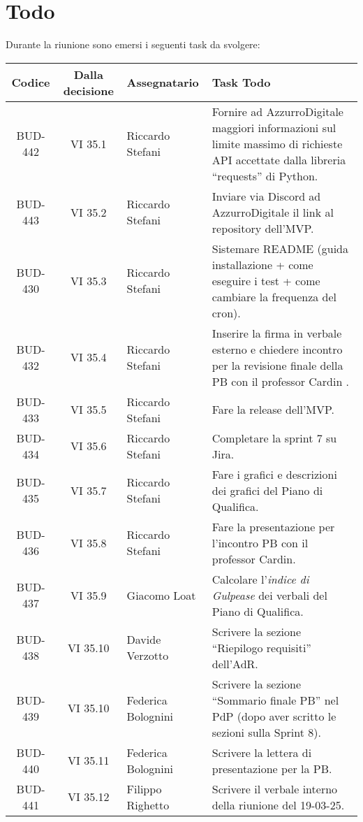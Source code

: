 
\section{Todo}

Durante la riunione sono emersi i seguenti task da svolgere:

\vspace{0.5cm}

\begin{table}[htbp]
\centering
{}
\begin{tabular}{|c|c|p{}|p{}|}
    \hline
    \rowcolor[gray]{0.75}
    \textbf{Codice} & \textbf{Dalla decisione} & \textbf{Assegnatario} & \textbf{Task Todo} \\
    \hline
    BUD-442 & VI 35.1 & Riccardo Stefani & Fornire ad AzzurroDigitale maggiori informazioni sul limite massimo di richieste API accettate dalla libreria “requests” di Python.\\
    \hline
    BUD-443 & VI 35.2 & Riccardo Stefani & Inviare via Discord ad AzzurroDigitale il link al repository dell’MVP.\\
    \hline
    BUD-430 & VI 35.3 & Riccardo Stefani & Sistemare README (guida installazione + come eseguire i test + come cambiare la frequenza del cron). \\
    \hline 
    BUD-432 & VI 35.4 & Riccardo Stefani & Inserire la firma in verbale esterno e chiedere incontro per la revisione finale della PB con il professor Cardin .\\
    \hline
    BUD-433 & VI 35.5 & Riccardo Stefani & Fare la release dell’MVP.\\
    \hline
    BUD-434 & VI 35.6 & Riccardo Stefani & Completare la sprint 7 su Jira. \\
    \hline
    BUD-435 & VI 35.7 & Riccardo Stefani & Fare i grafici e descrizioni dei grafici del Piano di Qualifica. \\
    \hline
    BUD-436 & VI 35.8 & Riccardo Stefani & Fare la presentazione per l’incontro PB con il professor Cardin. \\
    \hline
    BUD-437 & VI 35.9 & Giacomo Loat & Calcolare l’\emph{indice di Gulpease} dei verbali del Piano di Qualifica. \\
    \hline
    BUD-438 & VI 35.10 & Davide Verzotto & Scrivere la sezione “Riepilogo requisiti” dell’AdR.\\
    \hline
    BUD-439 & VI 35.10 & Federica Bolognini & Scrivere la sezione “Sommario finale PB” nel PdP (dopo aver scritto le sezioni sulla Sprint 8). \\
    \hline
    BUD-440 & VI 35.11 & Federica Bolognini & Scrivere la lettera di presentazione per la PB. \\
    \hline
    BUD-441 & VI 35.12 & Filippo Righetto & Scrivere il verbale interno della riunione del 19-03-25. \\
    \hline

\end{tabular}
\end{table}
